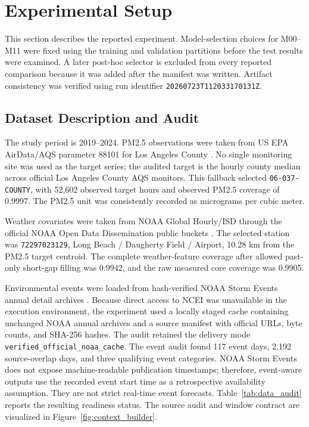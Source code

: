 \section{Experimental Setup}

This section describes the reported experiment. Model-selection choices for
M00--M11 were fixed using the training and validation partitions before the
test results were examined. A later post-hoc selector is excluded from every
reported comparison because it was added after the manifest was written.
Artifact consistency was verified using run identifier
\texttt{20260723T112033170131Z}.

\subsection{Dataset Description and Audit}
The study period is 2019--2024. PM2.5 observations were taken from US EPA
AirData/AQS parameter 88101 for Los Angeles County \cite{epaairdata2026}. No
single monitoring site was used as the target series; the audited target is the
hourly county median across official Los Angeles County AQS monitors. This
fallback selected \texttt{06-037-COUNTY}, with 52,602 observed target hours and
observed PM2.5 coverage of 0.9997. The PM2.5 unit was consistently recorded as
micrograms per cubic meter.

Weather covariates were taken from NOAA Global Hourly/ISD through the official
NOAA Open Data Dissemination public buckets \cite{noaaisd2026}. The selected
station was \texttt{72297023129}, Long Beach / Daugherty Field / Airport,
10.28 km from the PM2.5 target centroid. The complete weather-feature coverage
after allowed past-only short-gap filling was 0.9942, and the raw measured core
coverage was 0.9905.

Environmental events were loaded from hash-verified NOAA Storm Events annual
detail archives \cite{noaastormevents2026}. Because direct access to NCEI was
unavailable in the execution environment, the experiment used a locally staged
cache containing unchanged NOAA annual archives and a source manifest with
official URLs, byte counts, and SHA-256 hashes. The audit retained the delivery
mode \texttt{verified\_official\_noaa\_cache}. The event audit found 117 event
days, 2,192 source-overlap days, and three qualifying event categories. NOAA
Storm Events does not expose machine-readable publication timestamps; therefore,
event-aware outputs use the recorded event start time as a retrospective
availability assumption. They are not strict real-time event forecasts.
Table~\ref{tab:data_audit} reports the resulting readiness status. The source
audit and window contract are visualized in Figure~\ref{fig:context_builder}.

